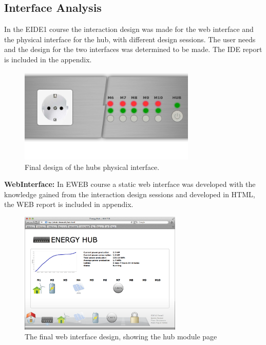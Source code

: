\subsection{Interface Analysis}
In the EIDE1 course the interaction design was made for the web interface and the physical interface for the hub, with different design sessions. The user needs and the design for the two interfaces was determined to be made. The IDE report is included in the appendix.
\begin{figure}[H]
	\begin{centering}
		 \includegraphics[width=0.75\textwidth]{images/hub_user_interact.png}
		\caption{Final design of the hubs physical interface.}
	\end{centering}
\end{figure}
\textbf{WebInterface:} In EWEB course a static web interface was developed with the knowledge gained from the interaction design sessions and developed in HTML, the WEB report is included in appendix.
\begin{figure}[H]
	\begin{centering}
		 \includegraphics[width=0.69\textwidth]{images/screen_hub_page.png}
		\caption{The final web interface design, showing the hub module page}
 	\end{centering}
\end{figure}
